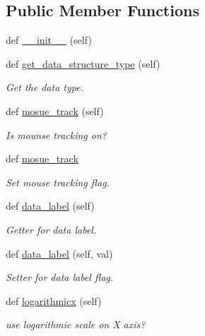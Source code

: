 \subsection*{Public Member Functions}
\begin{DoxyCompactItemize}
\item 
def \mbox{\hyperlink{classbridges_1_1line__chart_1_1_line_chart_a20c96d892b92624aa367710c9b4386fa}{\+\_\+\+\_\+init\+\_\+\+\_\+}} (self)
\item 
def \mbox{\hyperlink{classbridges_1_1line__chart_1_1_line_chart_a8124cb8693d6564a64264747d6ca5021}{get\+\_\+data\+\_\+structure\+\_\+type}} (self)
\begin{DoxyCompactList}\small\item\em Get the data type. \end{DoxyCompactList}\item 
def \mbox{\hyperlink{classbridges_1_1line__chart_1_1_line_chart_ad189e3efb7abb05944067fc171f6baf8}{mosue\+\_\+track}} (self)
\begin{DoxyCompactList}\small\item\em Is mounse tracking on? \end{DoxyCompactList}\item 
def \mbox{\hyperlink{classbridges_1_1line__chart_1_1_line_chart_a193acd762b88d9e112729adf56cdbcd2}{mosue\+\_\+track}}
\begin{DoxyCompactList}\small\item\em Set mouse tracking flag. \end{DoxyCompactList}\item 
def \mbox{\hyperlink{classbridges_1_1line__chart_1_1_line_chart_a0b93e3215dbaefa1e24bd2881393014c}{data\+\_\+label}} (self)
\begin{DoxyCompactList}\small\item\em Getter for data label. \end{DoxyCompactList}\item 
def \mbox{\hyperlink{classbridges_1_1line__chart_1_1_line_chart_a92796d1738604f9d6417fa7eebb4352e}{data\+\_\+label}} (self, val)
\begin{DoxyCompactList}\small\item\em Setter for data label flag. \end{DoxyCompactList}\item 
def \mbox{\hyperlink{classbridges_1_1line__chart_1_1_line_chart_a7f2d2f772e00af6ce08aa40e1efb195c}{logarithmicx}} (self)
\begin{DoxyCompactList}\small\item\em use logarithmic scale on X axis? \end{DoxyCompactList}\item 

\end{DoxyCompactItemize}
